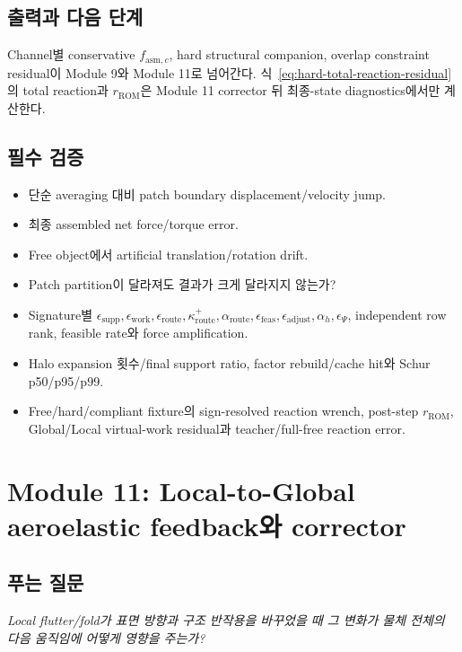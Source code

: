 \documentclass[11pt,a4paper]{article}
\begin{document}
\subsection*{출력과 다음 단계}

Channel별 conservative \(f_{\mathrm{asm},c}\), hard structural companion,
overlap constraint residual이 Module 9와 Module 11로 넘어간다.
식~\eqref{eq:hard-total-reaction-residual}의 total reaction과 \(r_{\mathrm{ROM}}\)은
Module 11 corrector 뒤 최종-state diagnostics에서만 계산한다.

\subsection*{필수 검증}

\begin{itemize}[leftmargin=1.5em]
  \item 단순 averaging 대비 patch boundary displacement/velocity jump.
  \item 최종 assembled net force/torque error.
  \item Free object에서 artificial translation/rotation drift.
  \item Patch partition이 달라져도 결과가 크게 달라지지 않는가?
  \item Signature별 \(\epsilon_{\mathrm{supp}},\epsilon_{\mathrm{work}},\epsilon_{\mathrm{route}},
  \kappa_{\mathrm{route}}^+,\alpha_{\mathrm{route}},\epsilon_{\mathrm{feas}},
  \epsilon_{\mathrm{adjust}},\alpha_h,\epsilon_\Psi\),
  independent row rank, feasible rate와 force amplification.
  \item Halo expansion 횟수/final support ratio, factor rebuild/cache hit와 Schur p50/p95/p99.
  \item Free/hard/compliant fixture의 sign-resolved reaction wrench, post-step \(r_{\mathrm{ROM}}\),
  Global/Local virtual-work residual과 teacher/full-free reaction error.
\end{itemize}

\section{Module 11: Local-to-Global aeroelastic feedback와 corrector}

\subsection*{푸는 질문}

\emph{Local flutter/fold가 표면 방향과 구조 반작용을 바꾸었을 때
그 변화가 물체 전체의 다음 움직임에 어떻게 영향을 주는가?}
\end{document}

